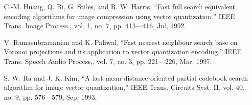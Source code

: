\begin{thebibliography}{100}
C.-M. Huang, Q. Bi, G. Stiles, and R. W. Harris, “Fast full search equivalent
encoding algorithms for image compression using vector quantization,”
IEEE Trans. Image Process., vol. 1, no. 7, pp. 413---416, Jul,
1992.

V. Ramasubramanian and K. Paliwal, “Fast nearest neighbour search
base on Voronoi projections and its application to vector quantization
encoding,” IEEE Trans. Speech Audio Process,, vol. 7, no. 3, pp.
221---226, Mar. 1997.

 S. W. Ra and J. K. Kim, “A fast mean-distance-oriented partial codebook
search algorithm for image vector quantization,” IEEE Trans. Circuits
Syst. II, vol. 40, no. 9, pp. 576---579, Sep. 1993.

\end{thebibliography}


\begin{appendices}

\end{appendices}




